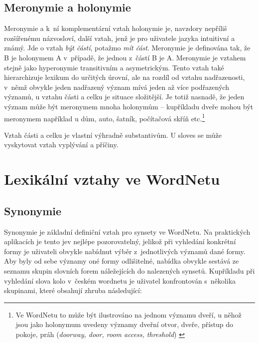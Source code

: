 \documentclass[a4paper,11pt,openany,twoside]{book}
\newcommand\ex{\textsf}
\begin{document}
				\subsection{Meronymie a holonymie}

					Meronymie a k~ní komplementární vztah holonymie je, navzdory nepříliš rozšířenému názvosloví, další vztah, jenž je pro uživatele jazyka intuitivní a známý. Jde o vztah \textit{být částí}, potažmo \textit{mít část}. Meronymie je definována tak, že B je holonymem A v~případě, že jednou z~částí B je A. Meronymie je vztahem stejně jako hyperonymie transitivním a asymetrickým. \parencite{cruse1986lexical} Tento vztah také hierarchizuje lexikum do určitých úrovní, ale na rozdíl od vztahu nadřazenosti, v~němž obvykle jeden nadřazený význam mívá jeden až více podřazených významů, u vztahu části a celku je situace složitější. Je totiž nasnadě, že jeden význam může být meronymem mnoha holonymům -- kupříkladu \ex{dveře} mohou být meronymem například u \ex{dům}, \ex{auto}, \ex{šatník}, \ex{počítačová skříň} etc.\footnote{Ve WordNetu to může být ilustrováno na jednom významu \ex{dveří}, u něhož jsou jako holonymum uvedeny významy \ex{dveřní otvor, dveře, přístup do pokoje, práh} (\textit{doorway, door, room access, threshold}) \parencite{princetonWN}}

					Vztah části a celku je vlastní výhradně substantivům. U sloves se může vyskytovat vztah vyplývání a příčiny.



			\section{Lexikální vztahy ve WordNetu}
			\label{cha:lexvztah}

				\subsection{Synonymie}
				\label{cha:synon}

					Synonymie je základní definiční vztah pro synsety ve WordNetu. Na praktických aplikacích je tento jev nejlépe pozorovatelný, jelikož při vyhledání konkrétní formy je uživateli obvykle nabídnut výběr z~jednotlivých významů dané formy. Aby byly od sebe významy oné formy odlišitelné, nabídka obvykle sestává ze seznamu skupin slovních forem náležejících do nalezených synsetů. Kupříkladu při vyhledání slova \ex{kolo} v~českém wordnetu je uživatel konfrontován s~několika skupinami, které obsahují zhruba následující:
\end{document}
